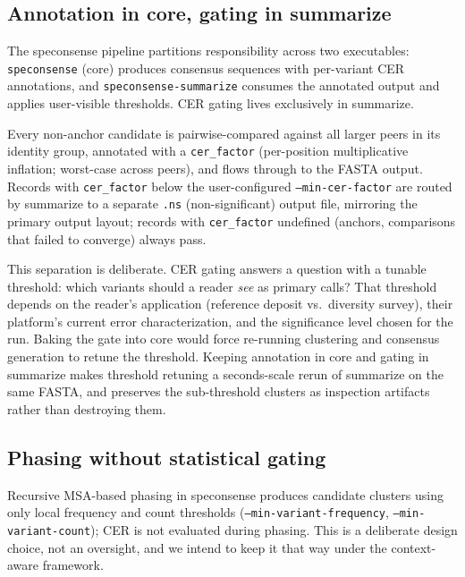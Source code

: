 \documentclass[11pt]{article}
\begin{document}
\subsection{Annotation in core, gating in summarize}
\label{sec:annotation_vs_gating}

The speconsense pipeline partitions responsibility across two executables:
\texttt{speconsense} (core) produces consensus sequences with per-variant CER
annotations, and \texttt{speconsense-summarize} consumes the annotated output
and applies user-visible thresholds. CER gating lives exclusively in summarize.

Every non-anchor candidate is pairwise-compared against all larger peers in
its identity group, annotated with a \texttt{cer\_factor} (per-position
multiplicative inflation; worst-case across peers), and flows through to the
FASTA output. Records with \texttt{cer\_factor} below the user-configured
\texttt{--min-cer-factor} are routed by summarize to a separate \texttt{.ns}
(non-significant) output file, mirroring the primary output layout; records
with \texttt{cer\_factor} undefined (anchors, comparisons that failed to
converge) always pass.

This separation is deliberate. CER gating answers a question with a tunable
threshold: which variants should a reader \emph{see} as primary calls? That
threshold depends on the reader's application (reference deposit vs.\
diversity survey), their platform's current error characterization, and the
significance level chosen for the run. Baking the gate into core would force
re-running clustering and consensus generation to retune the threshold.
Keeping annotation in core and gating in summarize makes threshold retuning a
seconds-scale rerun of summarize on the same FASTA, and preserves the
sub-threshold clusters as inspection artifacts rather than destroying them.

\subsection{Phasing without statistical gating}
\label{sec:phasing_design}

Recursive MSA-based phasing in speconsense produces candidate clusters using
only local frequency and count thresholds (\texttt{--min-variant-frequency},
\texttt{--min-variant-count}); CER is not evaluated during phasing. This is
a deliberate design choice, not an oversight, and we intend to keep it that
way under the context-aware framework.
\end{document}
